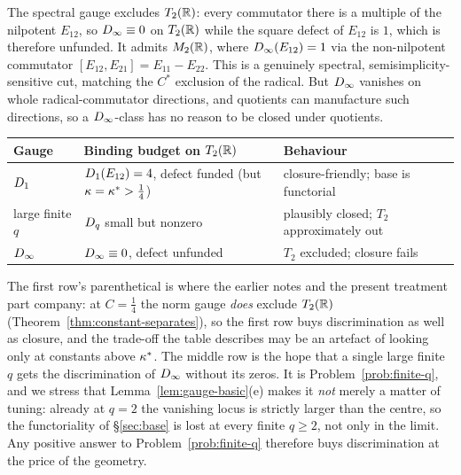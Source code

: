 \begin{proposition}
\label{prop:dinf-fragile}
The spectral gauge excludes $T_2(\mathbb{R})$: every commutator there is a multiple of
the nilpotent $E_{12}$, so $D_\infty\equiv0$ on $T_2(\mathbb{R})$ while the square
defect of $E_{12}$ is $1$, which is therefore unfunded.  It admits $M_2(\mathbb{R})$,
where $D_\infty(E_{12})=1$ via the non-nilpotent commutator
$[E_{12},E_{21}]=E_{11}-E_{22}$.  This is a genuinely spectral,
semisimplicity-sensitive cut, matching the $C^*$ exclusion of the radical.  But
$D_\infty$ vanishes on whole radical-commutator directions, and quotients
can manufacture such directions, so a $D_\infty$-class has no reason to be
closed under quotients.
\end{proposition}

\begin{remark}
\begin{center}
\begin{tabular}{lll}
\toprule
Gauge & Binding budget on $T_2(\mathbb{R})$ & Behaviour \\
\midrule
$D_1$ & $D_1(E_{12})=4$, defect funded (but $\kappa=\kappa^*>\tfrac14$) & closure-friendly; base is functorial \\
large finite $q$ & $D_q$ small but nonzero & plausibly closed; $T_2$ approximately out \\
$D_\infty$ & $D_\infty\equiv0$, defect unfunded & $T_2$ excluded; closure fails \\
\bottomrule
\end{tabular}
\end{center}
The first row's parenthetical is where the earlier notes and the present
treatment part company: at $C=\tfrac14$ the norm gauge \emph{does} exclude
$T_2(\mathbb{R})$ (Theorem~\ref{thm:constant-separates}), so the first row buys
discrimination as well as closure, and the trade-off the table describes may be
an artefact of looking only at constants above $\kappa^*$.  The middle row is the
hope that a single large finite $q$ gets the discrimination of $D_\infty$
without its zeros.  It is
Problem~\ref{prob:finite-q}, and we stress that
Lemma~\ref{lem:gauge-basic}(e) makes it \emph{not} merely a matter of tuning:
already at $q=2$ the vanishing locus is strictly larger than the centre, so the
functoriality of \S\ref{sec:base} is lost at every finite $q\ge2$, not only in
the limit.  Any positive answer to Problem~\ref{prob:finite-q} therefore buys
discrimination at the price of the geometry.
\end{remark}
